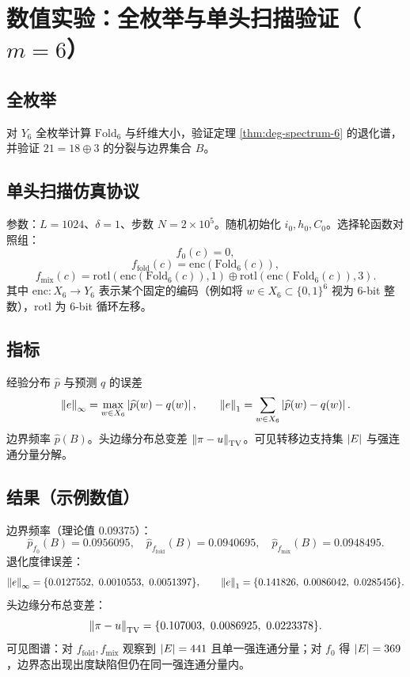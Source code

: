 \section{数值实验：全枚举与单头扫描验证（\texorpdfstring{$m=6$}{m=6}）}

\subsection{全枚举}

对 $Y_6$ 全枚举计算 $\mathrm{Fold}_6$ 与纤维大小，验证定理 \ref{thm:deg-spectrum-6} 的退化谱，并验证 $21=18\oplus 3$ 的分裂与边界集合 $B$。

\subsection{单头扫描仿真协议}

参数：$L=1024$、$\delta=1$、步数 $N=2\times 10^5$。随机初始化 $i_0,h_0,C_0$。选择轮函数对照组：
\[
f_0(c)=0,
\]
\[
f_{\mathrm{fold}}(c)=\mathrm{enc}(\mathrm{Fold}_6(c)),
\]
\[
f_{\mathrm{mix}}(c)=\mathrm{rotl}(\mathrm{enc}(\mathrm{Fold}_6(c)),1)\oplus \mathrm{rotl}(\mathrm{enc}(\mathrm{Fold}_6(c)),3).
\]
其中 $\mathrm{enc}:X_6\to Y_6$ 表示某个固定的编码（例如将 $w\in X_6\subset\{0,1\}^6$ 视为 6-bit 整数），$\mathrm{rotl}$ 为 6-bit 循环左移。

\subsection{指标}

经验分布 $\widehat{p}$ 与预测 $q$ 的误差
\[
\left\lVert e\right\rVert_{\infty}=\max_{w\in X_6}\left\lvert \widehat{p}(w)-q(w)\right\rvert,\qquad
\left\lVert e\right\rVert_{1}=\sum_{w\in X_6}\left\lvert \widehat{p}(w)-q(w)\right\rvert.
\]
边界频率 $\widehat{p}(B)$。头边缘分布总变差 $\left\lVert \pi-u\right\rVert_{\mathrm{TV}}$。可见转移边支持集 $\left\lvert E\right\rvert$ 与强连通分量分解。

\subsection{结果（示例数值）}

边界频率（理论值 $0.09375$）：
\[
\widehat{p}_{f_0}(B)=0.0956095,\quad
\widehat{p}_{f_{\mathrm{fold}}}(B)=0.0940695,\quad
\widehat{p}_{f_{\mathrm{mix}}}(B)=0.0948495.
\]
退化度律误差：
\[
\norm{e}_{\infty}=\{0.0127552,\ 0.0010553,\ 0.0051397\},\qquad
\norm{e}_{1}=\{0.141826,\ 0.0086042,\ 0.0285456\}.
\]
头边缘分布总变差：
\[
\norm{\pi-u}_{\TV}=\{0.107003,\ 0.0086925,\ 0.0223378\}.
\]
可见图谱：对 $f_{\mathrm{fold}},f_{\mathrm{mix}}$ 观察到 $\left\lvert E\right\rvert=441$ 且单一强连通分量；对 $f_0$ 得 $\left\lvert E\right\rvert=369$，边界态出现出度缺陷但仍在同一强连通分量内。

